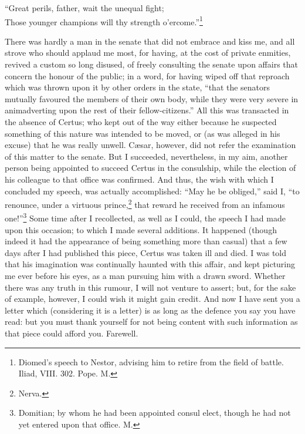 ``Great perils, father, wait the unequal fight;\\
Those younger champions will thy strength o'ercome.''\footnote{Diomed's speech to
Nestor, advising him to retire from the field of battle. Iliad, VIII. 302.
Pope. M.}

There was hardly a man in the senate that did not embrace and kiss me, and
all strove who should applaud me most, for having, at the cost of private
enmities, revived a custom so long disused, of freely consulting the
senate upon affairs that concern the honour of the public; in a word, for
having wiped off that reproach which was thrown upon it by other orders in
the state, ``that the senators mutually favoured the members of their own
body, while they were very severe in animadverting upon the rest of their
fellow-citizens.'' All this was transacted in the absence of Certus; who
kept out of the way either because he suspected something of this nature
was intended to be moved, or (as was alleged in his excuse) that he was
really unwell. Cæsar, however, did not refer the examination of this
matter to the senate. But I succeeded, nevertheless, in my aim, another
person being appointed to succeed Certus in the consulship, while the
election of his colleague to that office was confirmed. And thus, the wish
with which I concluded my speech, was actually accomplished: ``May he be
obliged,'' said I, ``to renounce, under a virtuous prince,\footnote{Nerva.}
that reward he received from an infamous one!''\footnote{Domitian; by whom he
had been appointed consul elect, though he had not yet entered upon that
office. M.} Some time after I
recollected, as well as I could, the speech I had made upon this occasion;
to which I made several additions. It happened (though indeed it had the
appearance of being something more than casual) that a few days after I
had published this piece, Certus was taken ill and died. I was told that
his imagination was continually haunted with this affair, and kept
picturing me ever before his eyes, as a man pursuing him with a drawn
sword. Whether there was any truth in this rumour, I will not venture to
assert; but, for the sake of example, however, I could wish it might gain
credit. And now I have sent you a letter which (considering it is a
letter) is as long as the defence you say you have read: but you must
thank yourself for not being content with such information as that piece
could afford you. Farewell.


